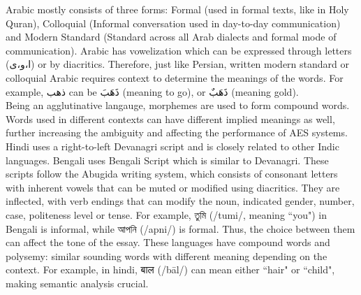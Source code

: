 \documentclass{article}
\begin{document}
Arabic mostly consists of three forms: Formal (used in formal texts, like in Holy Quran), Colloquial (Informal conversation used in day-to-day communication) and Modern Standard (Standard across all Arab dialects and formal mode of communication). Arabic has vowelization which can be expressed through letters (\textarabic{ا،و،ى}) or by diacritics. Therefore, just like Persian, written modern standard or colloquial Arabic requires context to determine the meanings of the words. For example, \textarabic{ذهب} can be \textarabic{ذَهَبَ} (meaning to go), or \textarabic{ذَهَبٌ} (meaning gold). \\
Being an agglutinative langauge, morphemes are used to form compound words. Words used in different contexts can have different implied meanings as well, further increasing the ambiguity and affecting the performance of AES systems. \\
Hindi uses a right-to-left Devanagri script and is closely related to other Indic languages. Bengali uses Bengali Script which is similar to Devanagri. These scripts follow the Abugida writing system, which consists of consonant letters with inherent vowels that can be muted or modified using diacritics. They are inflected, with verb endings that can modify the noun, indicated gender, number, case, politeness level or tense. For example, \textbengali{তুমি} (/tumi/, meaning ``you") in Bengali is informal, while \textbengali{আপনি} (/apni/) is formal. Thus, the choice between them can affect the tone of the essay. These languages have compound words and polysemy: similar sounding words with different meaning depending on the context. For example, in hindi, \texthindi{बाल} (/bāl/) can mean either ``hair" or ``child", making semantic analysis crucial.
\end{document}
